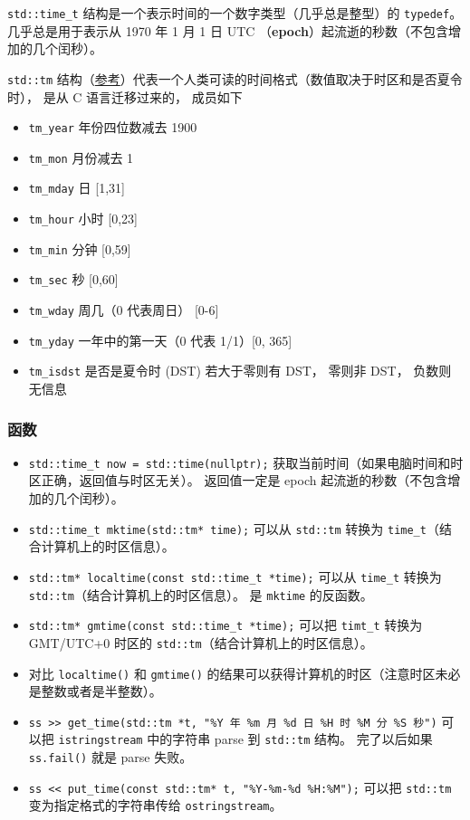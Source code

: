 
\begin{issues}
\issueDraft
\end{issues}


\verb|std::time_t| 结构是一个表示时间的一个数字类型（几乎总是整型）的 \verb|typedef|。 几乎总是用于表示从 1970 年 1 月 1 日 UTC （\textbf{epoch}）起流逝的秒数（不包含增加的几个闰秒）。

\verb|std::tm| 结构（\href{https://en.cppreference.com/w/cpp/chrono/c/tm}{参考}）代表一个人类可读的时间格式（数值取决于时区和是否夏令时）， 是从 C 语言迁移过来的， 成员如下
\begin{itemize}
\item \verb|tm_year| 年份四位数减去 1900
\item \verb|tm_mon| 月份减去 1
\item \verb|tm_mday| 日 [1,31]
\item \verb|tm_hour| 小时 [0,23]
\item \verb|tm_min| 分钟 [0,59]
\item \verb|tm_sec| 秒 [0,60]
\end{itemize}
\begin{itemize}
\item \verb|tm_wday| 周几（0 代表周日） [0-6]
\item \verb|tm_yday| 一年中的第一天（0 代表 1/1）[0, 365]
\item \verb|tm_isdst| 是否是夏令时 (DST) 若大于零则有 DST， 零则非 DST， 负数则无信息
\end{itemize}

\subsubsection{函数}
\begin{itemize}
\item \verb|std::time_t now = std::time(nullptr);| 获取当前时间（如果电脑时间和时区正确，返回值与时区无关）。 返回值一定是 epoch 起流逝的秒数（不包含增加的几个闰秒）。
\item \verb|std::time_t mktime(std::tm* time);| 可以从 \verb|std::tm| 转换为 \verb|time_t|（结合计算机上的时区信息）。
\item \verb|std::tm* localtime(const std::time_t *time);| 可以从 \verb|time_t| 转换为 \verb|std::tm|（结合计算机上的时区信息）。 是 \verb|mktime| 的反函数。
\item \verb|std::tm* gmtime(const std::time_t *time);| 可以把 \verb|timt_t| 转换为 GMT/UTC+0 时区的 \verb|std::tm|（结合计算机上的时区信息）。
\item 对比 \verb|localtime()| 和 \verb|gmtime()| 的结果可以获得计算机的时区（注意时区未必是整数或者是半整数）。
\item \verb|ss >> get_time(std::tm *t, "%Y 年 %m 月 %d 日 %H 时 %M 分 %S 秒")| 可以把 \verb|istringstream| 中的字符串 parse 到 \verb|std::tm| 结构。 完了以后如果 \verb|ss.fail()| 就是 parse 失败。
\item \verb|ss << put_time(const std::tm* t, "%Y-%m-%d %H:%M");| 可以把 \verb|std::tm| 变为指定格式的字符串传给 \verb|ostringstream|。
\end{itemize}
